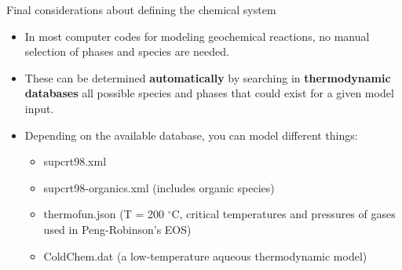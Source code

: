%
\begin{frame}{Final considerations about defining the chemical system}
	\vskip 10pt
\begin{itemize}
\item In most computer codes for modeling geochemical reactions, no manual
selection of phases and species are needed. 
\pause
\item These can be determined \textbf{automatically} by searching in \textbf{thermodynamic
databases} all possible species and phases that could exist for a
given model input. 
\pause
\item Depending on the available database, you can model different things: 
\begin{itemize}
\item supcrt98.xml
\item supcrt98-organics.xml (includes organic species)
\item thermofun.json (T = 200 $^\circ$C, critical temperatures and pressures of gases used in Peng-Robinson's EOS) 
\item ColdChem.dat (a low-temperature aqueous thermodynamic model)
\end{itemize}

\end{itemize}
\end{frame}
